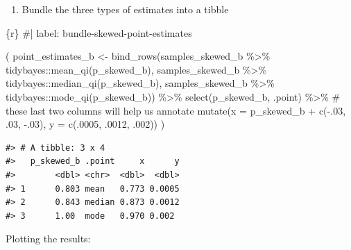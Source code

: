 \documentclass[
  letterpaper,
  DIV=11,
  numbers=noendperiod]{scrreprt}
\newenvironment{Shaded}{\begin{snugshade}}{\end{snugshade}}
\newcommand{\AttributeTok}[1]{\textcolor[rgb]{0.40,0.45,0.13}{#1}}
\newcommand{\CommentTok}[1]{\textcolor[rgb]{0.37,0.37,0.37}{#1}}
\newcommand{\DecValTok}[1]{\textcolor[rgb]{0.68,0.00,0.00}{#1}}
\newcommand{\FunctionTok}[1]{\textcolor[rgb]{0.28,0.35,0.67}{#1}}
\newcommand{\InformationTok}[1]{\textcolor[rgb]{0.37,0.37,0.37}{#1}}
\newcommand{\NormalTok}[1]{\textcolor[rgb]{0.00,0.23,0.31}{#1}}
\newcommand{\OtherTok}[1]{\textcolor[rgb]{0.00,0.23,0.31}{#1}}
\newcommand{\SpecialCharTok}[1]{\textcolor[rgb]{0.37,0.37,0.37}{#1}}
\providecommand{\tightlist}{%
  \setlength{\itemsep}{0pt}\setlength{\parskip}{0pt}}\usepackage{longtable,booktabs,array}
\begin{document}
\begin{enumerate}
\def\labelenumi{\arabic{enumi}.}
\tightlist
\item
  Bundle the three types of estimates into a tibble
\end{enumerate}

\begin{Shaded}
\begin{Highlighting}[]
\InformationTok{\textasciigrave{}\textasciigrave{}\textasciigrave{}\{r\}}
\CommentTok{\#| label: bundle{-}skewed{-}point{-}estimates}

\NormalTok{(}
\NormalTok{  point\_estimates\_b }\OtherTok{\textless{}{-}}
  \FunctionTok{bind\_rows}\NormalTok{(samples\_skewed\_b }\SpecialCharTok{\%\textgreater{}\%}\NormalTok{ tidybayes}\SpecialCharTok{::}\FunctionTok{mean\_qi}\NormalTok{(p\_skewed\_b),}
\NormalTok{            samples\_skewed\_b }\SpecialCharTok{\%\textgreater{}\%}\NormalTok{ tidybayes}\SpecialCharTok{::}\FunctionTok{median\_qi}\NormalTok{(p\_skewed\_b),}
\NormalTok{            samples\_skewed\_b }\SpecialCharTok{\%\textgreater{}\%}\NormalTok{ tidybayes}\SpecialCharTok{::}\FunctionTok{mode\_qi}\NormalTok{(p\_skewed\_b)) }\SpecialCharTok{\%\textgreater{}\%} 
  \FunctionTok{select}\NormalTok{(p\_skewed\_b, .point) }\SpecialCharTok{\%\textgreater{}\%} 
  \CommentTok{\# these last two columns will help us annotate  }
  \FunctionTok{mutate}\NormalTok{(}\AttributeTok{x =}\NormalTok{ p\_skewed\_b }\SpecialCharTok{+} \FunctionTok{c}\NormalTok{(}\SpecialCharTok{{-}}\NormalTok{.}\DecValTok{03}\NormalTok{, .}\DecValTok{03}\NormalTok{, }\SpecialCharTok{{-}}\NormalTok{.}\DecValTok{03}\NormalTok{),}
         \AttributeTok{y =} \FunctionTok{c}\NormalTok{(.}\DecValTok{0005}\NormalTok{, .}\DecValTok{0012}\NormalTok{, .}\DecValTok{002}\NormalTok{))}
\NormalTok{)}
\InformationTok{\textasciigrave{}\textasciigrave{}\textasciigrave{}}
\end{Highlighting}
\end{Shaded}

\begin{verbatim}
#> # A tibble: 3 x 4
#>   p_skewed_b .point     x      y
#>        <dbl> <chr>  <dbl>  <dbl>
#> 1      0.803 mean   0.773 0.0005
#> 2      0.843 median 0.873 0.0012
#> 3      1.00  mode   0.970 0.002
\end{verbatim}

Plotting the results:
\end{document}
